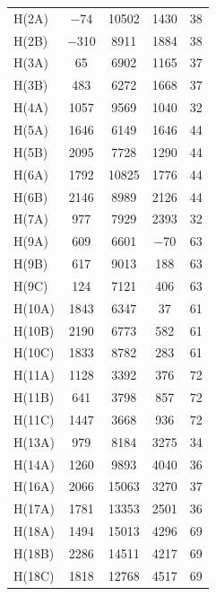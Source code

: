 \begin{center}
\tablelasttail{\bottomrule}
 {\footnotesize \singlespacing
\begin{supertabular}{lcccc}
H(2A)&	$-$74&		10502&	1430		&38 \\
H(2B)&	$-$310&	8911&	1884	 	&38\\ 
H(3A)&	65&	6902	& 1165				&37\\
H(3B)&	483&	6272	&1668			&37\\
H(4A)&	1057	& 9569&	1040			&32\\
H(5A)&	1646	& 6149&	1646				&44\\
H(5B)&	2095&	7728	&1290				&44\\
H(6A)&	1792&	10825&	1776			&44\\
H(6B)&	2146&	8989&	2126				&44\\
H(7A)&	977&	7929&	2393				&32\\
H(9A)&	609&	6601	&$-$70				&63\\
H(9B)&	617&	9013	&188				&63\\
H(9C)&	124&	7121	&406				&63\\
H(10A)&	1843&	6347&	37				&61\\
H(10B)&	2190	&6773&	582				&61\\
H(10C)&	1833	&8782&	283				&61\\
H(11A)&	1128&	3392	&376				&72\\
H(11B)&	641&	3798&	857				&72\\
H(11C)&	1447	&3668&	936				&72\\
H(13A)&	979&	8184&	3275				&34\\
H(14A)&	1260	&9893&	4040				&36\\
H(16A)&	2066&	15063&	3270			&37\\
H(17A)&	1781	&13353&	2501			&36\\
H(18A)&	1494&	15013&	4296			&69\\
H(18B)&	2286&	14511&	4217			&69\\
H(18C)&	1818	&12768&	4517			&69\\
\end{supertabular}
}
\end{center}

